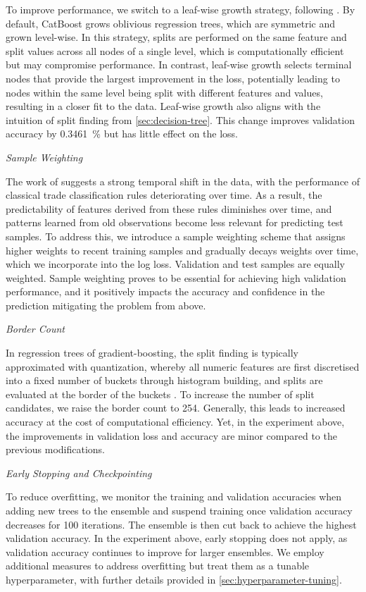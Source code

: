 To improve performance, we switch to a leaf-wise growth strategy, following \textcite[][4]{chenXGBoostScalableTree2016}. By default, CatBoost grows oblivious regression trees, which are symmetric and grown level-wise. In this strategy, splits are performed on the same feature and split values across all nodes of a single level, which is computationally efficient but may compromise performance. In contrast, leaf-wise growth selects terminal nodes that provide the largest improvement in the loss, potentially leading to nodes within the same level being split with different features and values, resulting in a closer fit to the data. Leaf-wise growth also aligns with the intuition of split finding from \cref{sec:decision-tree}. This change improves validation accuracy by \SI{0.3461}{\percent} but has little effect on the loss.

\emph{Sample Weighting}

The work of \textcite[][36--38]{grauerOptionTradeClassification2022} suggests a strong temporal shift in the data, with the performance of classical trade classification rules deteriorating over time.  As a result, the predictability of features derived from these rules diminishes over time, and patterns learned from old observations become less relevant for predicting test samples. To address this, we introduce a sample weighting scheme that assigns higher weights to recent training samples and gradually decays weights over time, which we incorporate into the log loss. Validation and test samples are equally weighted. Sample weighting proves to be essential for achieving high validation performance, and it positively impacts the accuracy and confidence in the prediction mitigating the problem from above.

\emph{Border Count}

In regression trees of gradient-boosting, the split finding is typically approximated with quantization, whereby all numeric features are first discretised into a fixed number of buckets through histogram building, and splits are evaluated at the border of the buckets \autocite[][2]{keLightGBMHighlyEfficient2017}. To increase the number of split candidates, we raise the border count to \num{254}. Generally, this leads to increased accuracy at the cost of computational efficiency. Yet, in the experiment above, the improvements in validation loss and accuracy are minor compared to the previous modifications.

\emph{Early Stopping and Checkpointing}

To reduce overfitting, we monitor the training and validation accuracies when adding new trees to the ensemble and suspend training once validation accuracy decreases for \num{100} iterations. The ensemble is then cut back to achieve the highest validation accuracy. In the experiment above, early stopping does not apply, as validation accuracy continues to improve for larger ensembles. We employ additional measures to address overfitting but treat them as a tunable hyperparameter, with further details provided in \cref{sec:hyperparameter-tuning}.

